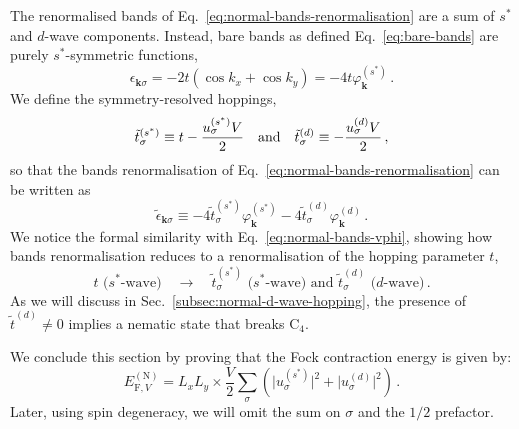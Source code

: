 The renormalised bands of Eq.~\eqref{eq:normal-bands-renormalisation} are a sum of $s^*$ and $d$-wave components. Instead, bare bands as defined Eq.~\eqref{eq:bare-bands} are purely $s^*$-symmetric functions, 
\begin{equation}\label{eq:normal-bands-vphi}
	\epsilon_{\mathbf{k}\sigma} = -2t (\cos k_x + \cos k_y) = -4t \varphi_\mathbf{k}^{(s^*)} \, .
\end{equation}
We define the symmetry-resolved hoppings,
\begin{equation}\label{eq:normal-tS-td}
	\tilde{t}^{(s^*)}_\sigma \equiv t - \frac{u_\sigma^{(s^*)} V}{2}
	\qq{and}
	\tilde{t}^{(d)}_\sigma \equiv - \frac{u_\sigma^{(d)} V}{2} \, ,
\end{equation}
so that the bands renormalisation of Eq.~\eqref{eq:normal-bands-renormalisation} can be written as
\begin{equation}\label{eq:normal-bands-renormalisation-vphi}
	\tilde{\epsilon}_{\mathbf{k}\sigma} \equiv -4\tilde{t}^{(s^*)}_\sigma \varphi_\mathbf{k}^{(s^*)} -4\tilde{t}^{(d)}_\sigma \varphi_\mathbf{k}^{(d)} \, .
\end{equation}
We notice the formal similarity with Eq.~\eqref{eq:normal-bands-vphi}, showing how bands renormalisation reduces to a renormalisation of the hopping parameter $t$,
\[
	\text{$t$ ($s^*$-wave)}
	\quad\to\quad
	\text{$\tilde{t}^{(s^*)}_\sigma$ ($s^*$-wave) and $\tilde{t}^{(d)}_\sigma$ ($d$-wave)} \, .
\]
As we will discuss in Sec.~\ref{subsec:normal-d-wave-hopping}, the presence of $\tilde{t}^{(d)} \neq 0$ implies a nematic state that breaks $\mathrm{C}_4$.

We conclude this section by proving that the Fock contraction energy is given by:
\begin{equation}\label{eq:normal-HV-fock-Ec}
	E_{\mathrm{F},V}^{(\mathrm{N})} = L_x L_y \times \frac{V}{2} \sum_\sigma \left(
		\big|
			u_\sigma^{(s^*)}
		\big|^2 + \big|
			u_\sigma^{(d)}
		\big|^2
	\right) \, .
\end{equation}
Later, using spin degeneracy, we will omit the sum on $\sigma$ and the $1/2$ prefactor.

